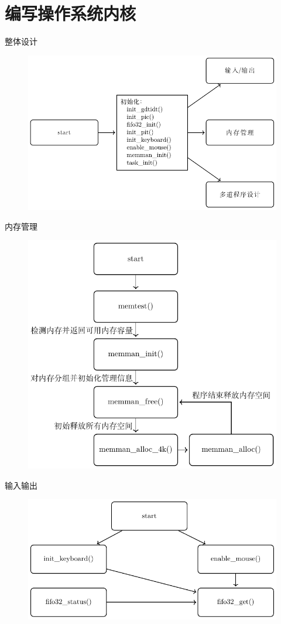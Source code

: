 \documentclass{beamer}
\begin{document}
    \section{编写操作系统内核}
    \begin{frame}{整体设计}
      \begin{figure}[H]
        \centering
        \includegraphics[width=\textwidth]{../Fig/func/run.pdf}
      \end{figure}
    \end{frame}
    \begin{frame}{内存管理}
      \begin{figure}[H]
        \centering
        \includegraphics[width=.5\textwidth]{../Fig/func/memman_e.pdf}
      \end{figure}
    \end{frame}
    \begin{frame}{输入输出}
      \begin{figure}[H]
        \centering
        \includegraphics[width=\textwidth]{../Fig/func/io.pdf}
      \end{figure}
    \end{frame}
\end{document}
